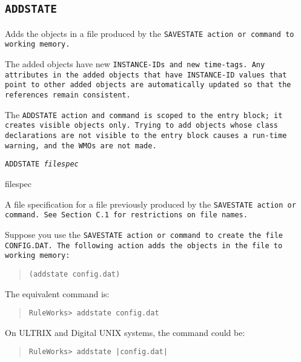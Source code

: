 \subsection{\tt{ADDSTATE}}

Adds the objects in a file produced by the \tt{SAVESTATE} action or
command to working memory.

The added objects have new \tt{INSTANCE-ID}s and new time-tags. Any
attributes in the added objects that have \tt{INSTANCE-ID} values that
point to other added objects are automatically updated so that the
references remain consistent.

The \tt{ADDSTATE} action and command is scoped to the entry block; it
creates visible objects only. Trying to add objects whose class
declarations are not visible to the entry block causes a run-time
warning, and the WMOs are not made.

\Format

\tt{ADDSTATE} \it{filespec}

\begin{arguments}
\item[filespec]

  A file specification for a file previously produced by the
  \tt{SAVESTATE} action or command. See Section C.1 for restrictions
  on file names.
\end{arguments}

\Example

Suppose you use the \tt{SAVESTATE} action or command to create the
file \tt{CONFIG.DAT}. The following action adds the objects in the
file to working memory:

\begin{quote}
\begin{verbatim}
(addstate config.dat)
\end{verbatim}
\end{quote}

The equivalent command is:
\begin{quote}
\begin{verbatim}
RuleWorks> addstate config.dat
\end{verbatim}
\end{quote}

On ULTRIX and Digital UNIX systems, the command could be:

\begin{quote}
\begin{verbatim}
RuleWorks> addstate |config.dat|
\end{verbatim}
\end{quote}

